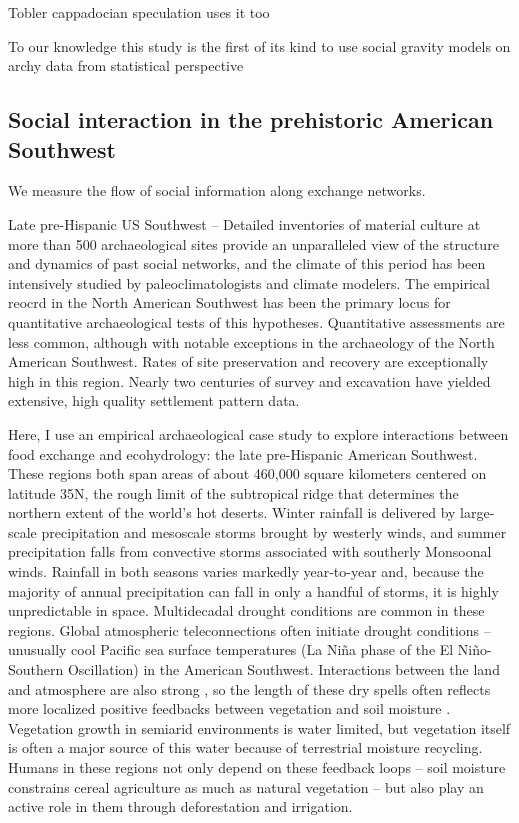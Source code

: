 \documentclass[fleqn,10pt]{wlscirep}
\begin{document}
Tobler cappadocian speculation uses it too

To our knowledge this study is the first of its kind to use social gravity models on archy data from statistical perspective


\subsection*{Social interaction in the prehistoric American Southwest}
 We measure the flow of social information along exchange networks.


Late pre-Hispanic US Southwest -- Detailed inventories of material culture at more than 500 archaeological sites provide an unparalleled view of the structure and dynamics of past social networks, and the climate of this period has been intensively studied by paleoclimatologists and climate modelers.
The empirical reocrd in the North American Southwest has been the primary locus for quantitative archaeological tests of this hypotheses. Quantitative assessments are less common, although with notable exceptions in the archaeology of the North American Southwest. Rates of site preservation and recovery are exceptionally high in this region. Nearly two centuries of survey and excavation have yielded extensive, high quality settlement pattern data. 

Here, I use an empirical archaeological case study to explore interactions between food exchange and ecohydrology: the late pre-Hispanic American Southwest. These regions both span areas of about 460,000 square kilometers centered on latitude 35\degree N, the rough limit of the subtropical ridge that determines the northern extent of the world's hot deserts. Winter rainfall is delivered by large-scale precipitation and mesoscale storms brought by westerly winds, and summer precipitation falls from convective storms associated with southerly Monsoonal winds. Rainfall in both seasons varies markedly year-to-year and, because the majority of annual precipitation can fall in only a handful of storms, it is highly unpredictable in space. Multidecadal drought conditions are common in these regions. Global atmospheric teleconnections often initiate drought conditions -- unusually cool Pacific sea surface temperatures (La Ni\~{n}a phase of the El Ni\~{n}o-Southern Oscillation) in the American Southwest. Interactions between the land and atmosphere are also strong \cite{Koster2004RegionsPrecipitation}, so the length of these dry spells often reflects more localized positive feedbacks between vegetation and soil moisture \cite{Ault2014AssessingData}. Vegetation growth in semiarid environments is water limited, but vegetation itself is often a major source of this  water because of terrestrial moisture recycling. Humans in these regions not only depend on these feedback loops -- soil moisture constrains cereal agriculture as much as natural vegetation -- but also play an active role in them through deforestation and irrigation.
\end{document}
